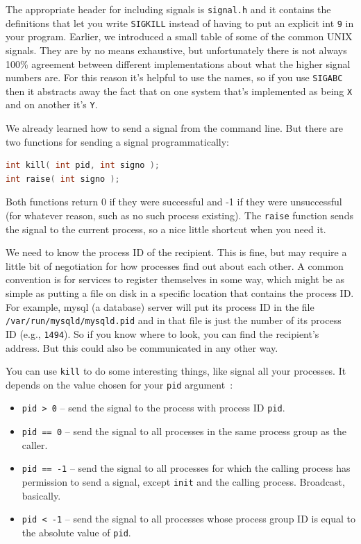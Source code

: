 \documentclass[a4paper]{report}
\begin{document}
The appropriate header for including signals is \texttt{signal.h} and it contains the definitions that let you write \texttt{SIGKILL} instead of having to put an explicit int \texttt{9} in your program.  Earlier, we introduced a small table of some of the common UNIX signals. They are by no means exhaustive, but unfortunately there is not always 100\% agreement between different implementations about what the higher signal numbers are. For this reason it's helpful to use the names, so if you use \texttt{SIGABC} then it abstracts away the fact that on one system that's implemented as being \texttt{X} and on another it's \texttt{Y}.

We already learned how to send a signal from the command line. But there are two functions for sending a signal programmatically:

\begin{lstlisting}[language=C]
int kill( int pid, int signo );
int raise( int signo );
\end{lstlisting}

Both functions return 0 if they were successful and -1 if they were unsuccessful (for whatever reason, such as no such process existing). The \texttt{raise} function sends the signal to the current process, so a nice little shortcut when you need it.

We need to know the process ID of the recipient. This is fine, but may require a little bit of negotiation for how processes find out about each other. A common convention is for services to register themselves in some way, which might be as simple as putting a file on disk in a specific location that contains the process ID. For example, mysql (a database) server will put its process ID in the file \texttt{/var/run/mysqld/mysqld.pid} and in that file is just the number of its process ID (e.g., \texttt{1494}). So if you know where to look, you can find the recipient's address. But this could also be communicated in any other way.

You can use \texttt{kill} to do some interesting things, like signal all your processes. It depends on the value chosen for your \texttt{pid} argument~\cite{apunix}:
\begin{itemize}
	\item \texttt{pid > 0} -- send the signal to the process with process ID \texttt{pid}.
	\item \texttt{pid == 0} -- send the signal to all processes in the same process group as the caller.
	\item \texttt{pid == -1} -- send the signal to all processes for which the calling process has permission to send a signal, except \texttt{init} and the calling process. Broadcast, basically.
	\item \texttt{pid < -1} -- send the signal to all processes whose process group ID is equal to the absolute value of \texttt{pid}.
\end{itemize}
\end{document}
